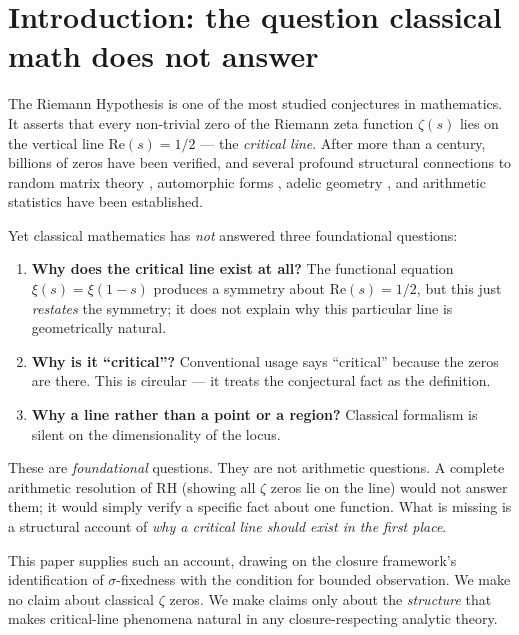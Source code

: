 \documentclass[11pt,a4paper]{article}
\theoremstyle{definition}
\theoremstyle{remark}
\begin{document}
\section{Introduction: the question classical math does not answer}\label{sec:intro}

The Riemann Hypothesis is one of the most studied conjectures in
mathematics. It asserts that every non-trivial zero of the Riemann zeta
function $\zeta(s)$ lies on the vertical line $\mathrm{Re}(s) = 1/2$ ---
the \emph{critical line}. After more than a century, billions of zeros
have been verified, and several profound structural connections to
random matrix theory \cite{KeatingSnaith}, automorphic forms
\cite{LanglandsBeyond}, adelic geometry \cite{ConnesAdelic}, and
arithmetic statistics have been established.

Yet classical mathematics has \emph{not} answered three foundational
questions:

\begin{enumerate}\itemsep0pt
  \item \textbf{Why does the critical line exist at all?} The functional
    equation $\xi(s) = \xi(1-s)$ produces a symmetry about
    $\mathrm{Re}(s) = 1/2$, but this just \emph{restates} the symmetry; it does
    not explain why this particular line is geometrically natural.
  \item \textbf{Why is it ``critical''?} Conventional usage says
    ``critical'' because the zeros are there. This is circular --- it
    treats the conjectural fact as the definition.
  \item \textbf{Why a line rather than a point or a region?} Classical
    formalism is silent on the dimensionality of the locus.
\end{enumerate}

These are \emph{foundational} questions. They are not arithmetic
questions. A complete arithmetic resolution of RH (showing all $\zeta$
zeros lie on the line) would not answer them; it would simply verify a
specific fact about one function. What is missing is a structural
account of \emph{why a critical line should exist in the first place}.

This paper supplies such an account, drawing on the closure framework's
identification of $\sigma$-fixedness with the condition for bounded
observation. We make no claim about classical $\zeta$ zeros. We make
claims only about the \emph{structure} that makes critical-line
phenomena natural in any closure-respecting analytic theory.
\end{document}
